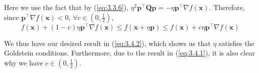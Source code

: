 \documentclass{article}
\begin{document}
Here we use the fact that by (\ref{eq:3.3.6}),
$ \eta^2\mathbf{p}^\top\mathbf{Qp} =
-\eta\mathbf{p}^\top\nabla f(\mathbf{x}) $. Therefore, since
$ \mathbf{p}^\top\nabla f(\mathbf{x}) < 0 $,
$ \forall c \in \left(0, \frac{1}{2}\right) $,
\begin{equation} \label{eq:3.4.2}
    f(\mathbf{x}) + (1 - c)\eta\mathbf{p}^\top\nabla f(\mathbf{x}) \le
    f(\mathbf{x} + \eta\mathbf{p}) \le
    f(\mathbf{x}) + c\eta\mathbf{p}^\top\nabla f(\mathbf{x})
\end{equation}

We thus have our desired result in (\ref{eq:3.4.2}), which shows us that
$ \eta $ satisfies the Goldstein conditions. Furthermore, due to the result
in (\ref{eq:3.4.1}), it is also clear why we have
$ c \in \left(0, \frac{1}{2}\right) $.
\end{document}

